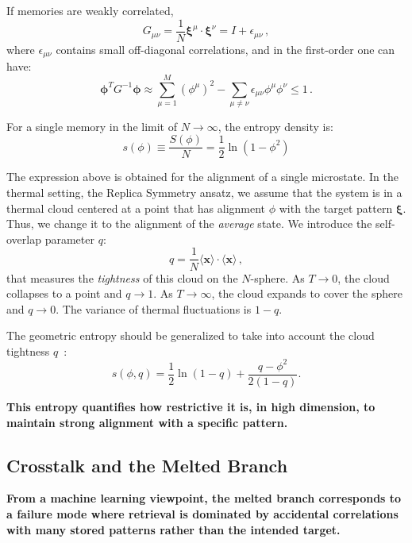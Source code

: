 \documentclass{article}
\theoremstyle{plain}
\theoremstyle{definition}
\theoremstyle{remark}
\begin{document}
If memories are weakly correlated,  
\begin{equation}
    G_{\mu\nu} = \frac{1}{N} \bm{\xi}^\mu \cdot \bm{\xi}^\nu = I + \epsilon_{\mu\nu}\,,
\end{equation}
where $\epsilon_{\mu\nu}$ contains small off-diagonal correlations, and
in the first-order one can have:
\begin{equation}
    \bm{\phi}^T G^{-1} \bm{\phi} \approx \sum_{\mu=1}^{M} (\phi^\mu)^2 - \sum_{\mu \neq \nu} \epsilon_{\mu\nu} \phi^\mu \phi^\nu \le 1\,.
    \label{eq:gram1}
\end{equation}

For a single memory in the limit of $N\to \infty$, the entropy density is:
\begin{equation}
    s(\phi) \equiv \frac{S(\phi)}N = \frac12 \ln ( 1 - \phi^2 )
\end{equation}

The expression above is obtained for the alignment of a single microstate. In the thermal setting, the Replica Symmetry ansatz,  we assume that the system is in a thermal cloud centered at a point that has alignment $\phi$ with the target pattern $\bm{\xi}$. Thus, we change it to the alignment of the \textit{average} state.  We introduce the self-overlap parameter $q$:
\begin{equation}
    q = \frac{1}{N} \langle \bm{x} \rangle \cdot \langle \bm{x} \rangle\,,
\end{equation}
that measures the \textit{tightness} of this cloud on the $N$-sphere. As $T \to 0$, the cloud collapses to a point and $q \to 1$. As $T \to \infty$, the cloud expands to cover the sphere and $q \to 0$. The variance of thermal fluctuations is $1-q$.

The geometric entropy should be generalized to take into account the cloud tightness $q$~\cite{gardner1988space}:
\begin{equation}
    s(\phi, q) = \frac{1}{2} \ln(1-q) + \frac{q - \phi^2}{2(1-q)}.
\end{equation}

\textbf{
This entropy quantifies how restrictive it is, in high dimension, to maintain strong alignment with a specific pattern.}

\subsection{Crosstalk and the Melted Branch}

\textbf{From a machine learning viewpoint, the melted branch corresponds to a failure mode where retrieval is dominated by accidental correlations with many stored patterns rather than the intended target.}
\end{document}

